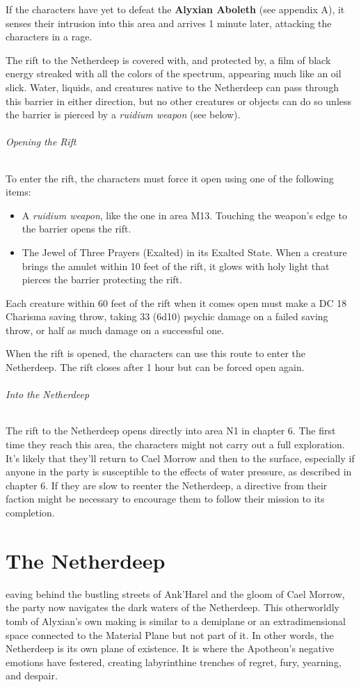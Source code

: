 \documentclass[10pt,a4paper,twoside,bg=print,twocolumn,openany,nodeprecatedcode]{dndbook}
\begin{document}
If the characters have yet to defeat the \textbf{Alyxian Aboleth} (see appendix A), it senses their intrusion into this area and arrives 1 minute later, attacking the characters in a rage.

The rift to the Netherdeep is covered with, and protected by, a film of black energy streaked with all the colors of the spectrum, appearing much like an oil slick. Water, liquids, and creatures native to the Netherdeep can pass through this barrier in either direction, but no other creatures or objects can do so unless the barrier is pierced by a \textit{ruidium weapon} (see below).

\subparagraph{Opening the Rift}
To enter the rift, the characters must force it open using one of the following items:


\begin{itemize}
\item A \textit{ruidium weapon}, like the one in area M13. Touching the weapon's edge to the barrier opens the rift.
\item The Jewel of Three Prayers (Exalted) in its Exalted State. When a creature brings the amulet within 10 feet of the rift, it glows with holy light that pierces the barrier protecting the rift.
\end{itemize}

Each creature within 60 feet of the rift when it comes open must make a DC 18 Charisma saving throw, taking 33 (6d10) psychic damage on a failed saving throw, or half as much damage on a successful one.

When the rift is opened, the characters can use this route to enter the Netherdeep. The rift closes after 1 hour but can be forced open again.

\subparagraph{Into the Netherdeep}
The rift to the Netherdeep opens directly into area N1 in chapter 6. The first time they reach this area, the characters might not carry out a full exploration. It's likely that they'll return to Cael Morrow and then to the surface, especially if anyone in the party is susceptible to the effects of water pressure, as described in chapter 6. If they are slow to reenter the Netherdeep, a directive from their faction might be necessary to encourage them to follow their mission to its completion.

\chapter{The Netherdeep}
eaving behind the bustling streets of Ank'Harel and the gloom of Cael Morrow, the party now navigates the dark waters of the Netherdeep. This otherworldly tomb of Alyxian's own making is similar to a demiplane or an extradimensional space connected to the Material Plane but not part of it. In other words, the Netherdeep is its own plane of existence. It is where the Apotheon's negative emotions have festered, creating labyrinthine trenches of regret, fury, yearning, and despair.
\end{document}
